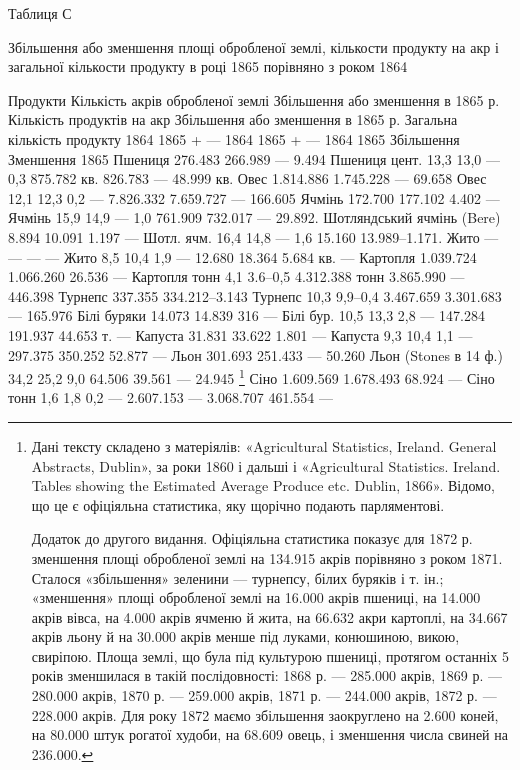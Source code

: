 Таблиця С

Збільшення або зменшення площі обробленої землі, кількости продукту на акр і загальної кількости
продукту в році 1865 порівняно з роком 1864

Продукти    Кількість акрів обробленої землі        Збільшення або зменшення в 1865 р. Кількість
продуктів на акр            Збільшення або зменшення в 1865 р. Загальна кількість продукту
    1864    1865 + — 1864        1865 + — 1864        1865    Збільшення    Зменшення 1865
Пшениця             276.483           266.989  — 9.494
Пшениця цент.    13,3    13,0 — 0,3    875.782    кв.    826.783    —   48.999 кв.
Овес                              1.814.886       1.745.228   —   69.658
Овес    12,1    12,3    0,2  —   7.826.332   7.659.727   —   166.605
Ячмінь                           172.700           177.102             4.402 —
Ячмінь     15,9    14,9    —   1,0    761.909        732.017  —  29.892.
Шотляндський ячмінь (Bere)    8.894    10.091    1.197   —
Шотл. ячм. 16,4    14,8  —  1,6    15.160        13.989--1.171.
Жито    —    —    —     —
Жито 8,5    10,4    1,9   —   12.680 18.364    5.684 кв. —
Картопля       1.039.724      1.066.260            26.536 —
Картопля тонн    4,1    3.6--0,5    4.312.388   тонн    3.865.990    —    446.398
Турнепс                      337.355    334.212--3.143
Турнепс 10,3    9,9--0,4    3.467.659        3.301.683     —     165.976
Білі буряки 14.073    14.839    316        —
Білі бур. 10,5    13,3    2,8     —     147.284     191.937    44.653 т.     —
Капуста        31.831    33.622    1.801 —
Капуста    9,3    10,4    1,1    —     297.375        350.252    52.877 —
Льон        301.693    251.433       —      50.260
Льон (Stones в 14 ф.) 34,2        25,2            9,0    64.506        39.561    —  24.945 \footnote{
Дані тексту складено з матеріялів: «Agricultural Statistics, Ireland. General Abstracts,
Dublin», за роки 1860 і дальші і «Agricultural Statistics. Ireland. Tables showing the Estimated
Average Produce etc. Dublin, 1866».
Відомо, що це є офіціяльна статистика, яку щорічно подають парляментові.

Додаток до другого видання. Офіціяльна статистика показує для 1872 р. зменшення площі обробленої
землі на 134.915 акрів порівняно з роком 1871. Сталося «збільшення» зеленини — турнепсу, білих
буряків і т. ін.; «зменшення» площі обробленої землі на 16.000 акрів пшениці, на 14.000 акрів вівса,
на 4.000 акрів ячменю й жита, на 66.632 акри картоплі, на 34.667 акрів льону й на 30.000 акрів менше
під луками, конюшиною, викою, свиріпою. Площа землі, що була під культурою пшениці, протягом
останніх 5 років зменшилася в такій послідовності: 1868 р. — 285.000 акрів, 1869 р. — 280.000 акрів,
1870 р. — 259.000 акрів, 1871 р. — 244.000 акрів, 1872 р. — 228.000 акрів. Для року 1872 маємо
збільшення заокруглено на 2.600 коней, на 80.000 штук рогатої худоби, на 68.609 овець, і зменшення
числа свиней на 236.000.
}
Сіно        1.609.569    1.678.493    68.924      —
Сіно тонн    1,6    1,8    0,2   —  2.607.153   —  3.068.707    461.554   —
